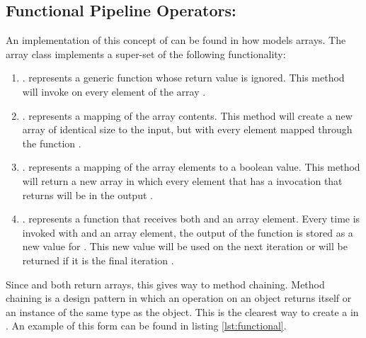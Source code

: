   

\subsection{Functional Pipeline Operators: \javascript}

An implementation of this concept of \pipelines can be found in how \javascript models arrays.  The array class implements a super-set of the following functionality:

\begin{enumerate}
  \item {}.   represents a generic function whose return value is ignored.  This method will invoke  on every element of the array \cite{arrayforeach16}.

  \item {}.   represents a mapping of the array contents.  This method will create a new array of identical size to the input, but with every element mapped through the  function \cite{arraymap16}.

  \item {}.   represents a mapping of the array elements to a boolean value.  This method will return a new array in which every element that has a  invocation that returns  will be in the output \cite{arrayfilter16}.

  \item {}.   represents a function that receives both  and an array element. Every time  is invoked with  and an array element, the output of the function is stored as a new value for .  This new value will be used on the next iteration or will be returned if it is the final iteration \cite{arrayreduce16}.

\end{enumerate}

Since  and  both return arrays, this gives way to method chaining. Method chaining is a design pattern in which an operation on an object returns itself or an instance of the same type as the object. This is the clearest way to create a \pipeline in \javascript. An example of this form can be found in listing \ref{lst:functional}.

